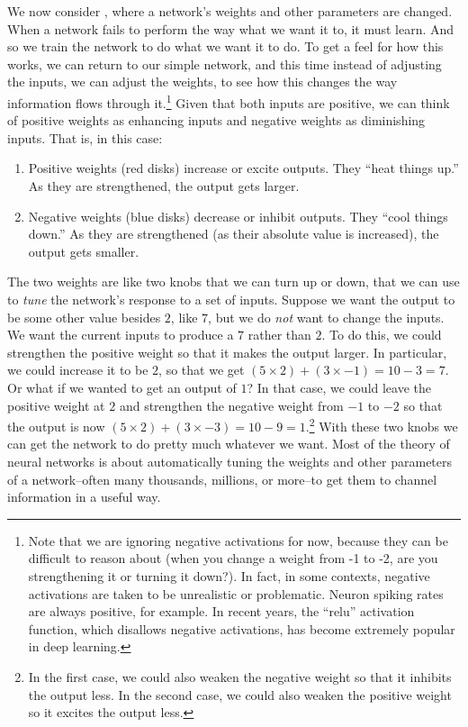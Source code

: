We now consider , where a network's weights and other parameters are changed. When a network fails to perform the way what we want it to, it must learn. And so we train the network to do what we want it to do. To get a feel for how this works, we can return to our simple network, and this time instead of adjusting the inputs, we can adjust the weights, to see how this changes the way information flows through it.\footnote{Note that we are ignoring negative activations for now, because they can be difficult to reason about (when you change a weight from -1 to -2, are you strengthening it or turning it down?). In fact, in some contexts, negative activations are taken to be unrealistic or problematic. Neuron spiking rates are always positive, for example. In recent years, the ``relu'' activation function, which disallows negative activations, has become extremely popular in deep learning.} Given that both inputs are positive, we can think of positive weights as enhancing inputs and negative weights as diminishing inputs. That is, in this case:
\begin{enumerate}
\item  Positive weights (red disks) increase or excite outputs. They ``heat things up.'' As they are strengthened, the output gets larger.
\item  Negative weights (blue disks) decrease or inhibit outputs. They ``cool things down.'' As they are strengthened (as their absolute value is increased), the output gets smaller.
\end{enumerate}
The two weights are like two knobs that we can turn up or down, that we can use to \emph{tune} the network's response to a set of inputs. Suppose we want the output to be some other value besides $2$, like $7$, but we do \emph{not} want to change the inputs. We want the current inputs to produce a $7$ rather than $2$. To do this, we could strengthen the positive weight so that it makes the output larger. In particular, we could increase it to be $2$, so that we get $(5 \times 2) + (3 \times -1) = 10 - 3 = 7$.  Or what if we wanted to get an output of $1$? In that case, we could leave the positive weight at $2$ and strengthen the negative weight from $-1$ to $-2$ so that the output is now $(5 \times 2) + (3 \times -3) = 10 - 9 = 1$.\footnote{In the first case, we could also weaken the negative weight so that it inhibits the output less. In the second case, we could also weaken the positive weight so it excites the output less.} With these two knobs we can get the network to do pretty much whatever we want. Most of the theory of neural networks is about automatically tuning the weights and other parameters of a network--often many thousands, millions, or more--to get them to channel information in a useful way.

